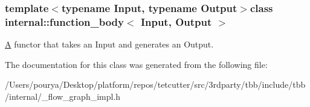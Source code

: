 \subsubsection*{template$<$typename Input, typename Output$>$class internal\+::function\+\_\+body$<$ Input, Output $>$}

\hyperlink{structA}{A} functor that takes an Input and generates an Output. 

The documentation for this class was generated from the following file\+:\begin{DoxyCompactItemize}
\item 
/\+Users/pourya/\+Desktop/platform/repos/tetcutter/src/3rdparty/tbb/include/tbb/internal/\+\_\+flow\+\_\+graph\+\_\+impl.\+h\end{DoxyCompactItemize}
